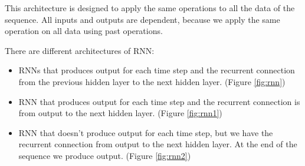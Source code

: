This architecture is designed to apply the same operations to all the data of the
sequence. All inputs and outputs are dependent, because we apply the same operation
on all data using past operations.

There are different architectures of RNN:
\begin{itemize}
    \item RNNs that produces output for each time step and the recurrent connection
          from the previous hidden layer to the next hidden layer. (Figure \ref{fig:rnn})
    \item RNN that produces output for each time step and the recurrent connection
          is from output to the next hidden layer. (Figure \ref{fig:rnn1})
    \item RNN that doesn't produce output for each time step, but we have the
          recurrent connection from output to the next hidden layer. At the end
          of the sequence we produce output. (Figure \ref{fig:rnn2})
\end{itemize}

